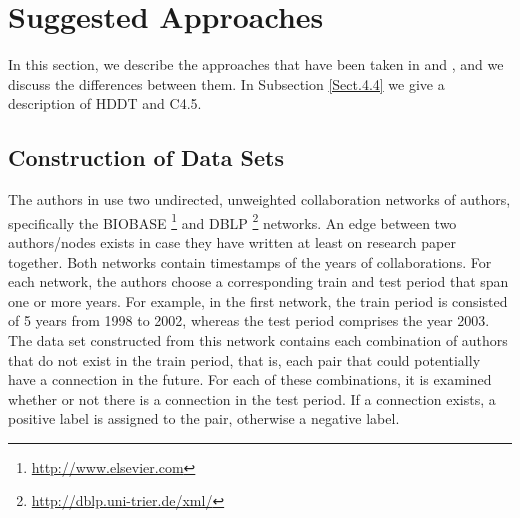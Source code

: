 \documentclass{acm_proc_article-sp}
\begin{document}
\section{Suggested Approaches}
\label{Sect.4}

In this section, we describe the approaches that have been taken in \cite{Hasan06linkprediction} and \cite{Lichtenwalter:2010:NPM:1835804.1835837}, and we discuss the differences between them. In Subsection \ref{Sect.4.4} we give a description of HDDT and C4.5.

\subsection{Construction of Data Sets}

The authors in \cite{Hasan06linkprediction} use two undirected, unweighted collaboration networks of authors, specifically the BIOBASE \footnote{\url{http://www.elsevier.com}} and DBLP \footnote{\url{http://dblp.uni-trier.de/xml/}} networks. An edge between two authors/nodes exists in case they have written at least on research paper together. Both networks contain timestamps of the years of collaborations. For each network, the authors choose a corresponding train and test period that span one or more years. For example, in the first network, the train period is consisted of 5 years from 1998 to 2002, whereas the test period comprises the year 2003. The data set constructed from this network contains each combination of authors that do not exist in the train period, that is, each pair that could potentially have a connection in the future. For each of these combinations, it is examined whether or not there is a connection in the test period. If a connection exists, a positive label is assigned to the pair, otherwise a negative label. 
\end{document}
